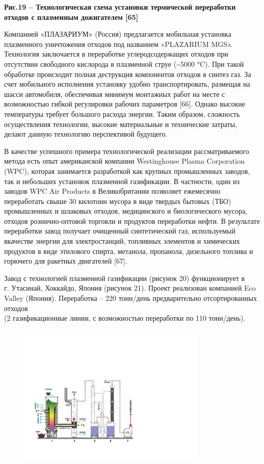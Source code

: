 {\bfseries Рис.19 -- Технологическая схема установки термической
переработки отходов с плазменным дожигателем {[}65{]}}

Компанией «ПЛАЗАРИУМ» (Россия) предлагается мобильная установка
плазменного уничтожения отходов под названием «PLAZARIUM MGS».
Технология заклю­чается в переработке углеродсодержащих отходов при
отсутствии свободного кислорода в плазменной струе (\textasciitilde5000
°C). При такой обработке происходит полная деструкция компонентов
отходов в синтез газ. За счет мобильного исполнения установку удобно
транспорти­ровать, размещая на шасси автомобиля, обеспечивая минимум
монтажных работ на месте с возможностью гибкой регулировки рабочих
параметров {[}66{]}. Однако высокие температуры требует большого расхода
энергии. Таким образом, сложность осуществления технологии, высокие
материальные и технические затраты, делают данную технологию
перспективой будущего.

В качестве успешного примера технологической реализации рассматриваемого
метода есть опыт американской компании Westinghouse Plasma Corporation
(WPC), которая занимается разработкой как крупных промышленных заводов,
так и небольших установок плазменной газификации. В частности, один из
заводов WPC Air Products в Великобритании позволяет ежемесячно
переработать свыше 30 килотонн мусора в виде твердых бытовых (ТБО)
промышленных и шлаковых отходов, медицинского и биологического мусора,
отходов рознично-оптовой торговли и продуктов переработки нефти. В
результате переработки завод получает очищенный синтетический газ,
используемый вкачестве энергии для электростанций, топливных элементов и
химических продуктов в виде этилового спирта, метанола, пропанола,
дизельного топлива и горючего для ракетных двигателей {[}67{]}.

Завод с технологией плазменной газификации (рисунок 20) функционирует
в\\
г. Утасинай, Хоккайдо, Япония (рисунок 21). Проект реализован компанией
Eco Valley (Япония). Переработка -- 220 тонн/день предварительно
отсортированных отходов\\
(2 газификационные линии, с возможностью переработки по 110 тонн/день).


\begin{figure}[H]
	\centering
	\includegraphics[width=0.8\textwidth]{media/chem2/image84}
	\caption*{}
\end{figure}


